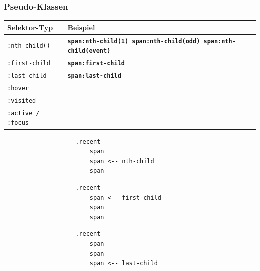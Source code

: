 \documentclass[a4paper, landscape, 8pt]{scrartcl}
\begin{document}
\begin{multicols*}{4}
        \subsubsection{Pseudo-Klassen}
        \begin{tabularx}{\columnwidth}{X X}
            \textbf{Selektor-Typ} & \textbf{Beispiel} \\
            \hline
            \texttt{:nth-child()} & {\bfseries \texttt{span:nth-child(1) span:nth-child(odd) span:nth-child(event)}} \\
            \hline
            \texttt{:first-child} & {\bfseries \texttt{span:first-child}} \\
            \hline
            \texttt{:last-child} & {\bfseries \texttt{span:last-child}} \\
            \hline
            \texttt{:hover} & \\
            \hline
            \texttt{:visited} & \\
            \hline
            \texttt{:active / :focus} &
        \end{tabularx}

        \begin{multicols*}{3}
            \begin{lstlisting}
                    .recent
                        span
                        span <-- nth-child
                        span
            \end{lstlisting}

            \columnbreak

            \begin{lstlisting}
                    .recent
                        span <-- first-child
                        span
                        span
            \end{lstlisting}

            \columnbreak

            \begin{lstlisting}
                    .recent
                        span
                        span
                        span <-- last-child
            \end{lstlisting}
        \end{multicols*}



\end{multicols*}
\end{document}
